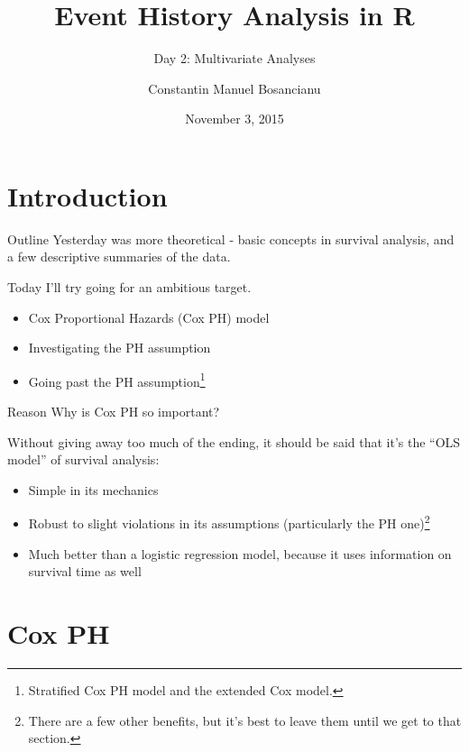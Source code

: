 \documentclass[12pt,english,pdf,xcolor=dvipsnames,aspectratio=169,handout]{beamer}\usepackage[]{graphicx}\usepackage[]{xcolor}
\title{Event History Analysis in R}
\subtitle{Day 2: Multivariate Analyses}
\author{Constantin Manuel Bosancianu}
\institute{Doctoral School of Political Science \\ Central European University, Budapest \\ \href{mailto:bosancianu@icloud.com}{bosancianu@icloud.com}}
\date{November 3, 2015}
\begin{document}
\maketitle




\section{Introduction}



\begin{frame}{Outline}
Yesterday was more theoretical - basic concepts in survival analysis, and a few descriptive summaries of the data.\bigskip

Today I'll try going for an ambitious target.\bigskip

\begin{itemize}
\item Cox Proportional Hazards (Cox PH) model
\item Investigating the PH assumption
\item Going past the PH assumption\footnote{Stratified Cox PH model and the extended Cox model.}
\end{itemize}

\end{frame}



\begin{frame}{Reason}
Why is Cox PH so important?\bigskip

Without giving away too much of the ending, it should be said that it's the ``OLS model'' of survival analysis:\bigskip

\begin{itemize}
\item Simple in its mechanics
\item Robust to slight violations in its assumptions (particularly the PH one)\footnote{There are a few other benefits, but it's best to leave them until we get to that section.}
\item Much better than a logistic regression model, because it uses information on survival time as well
\end{itemize}

\end{frame}




\section{Cox PH}
\end{document}

